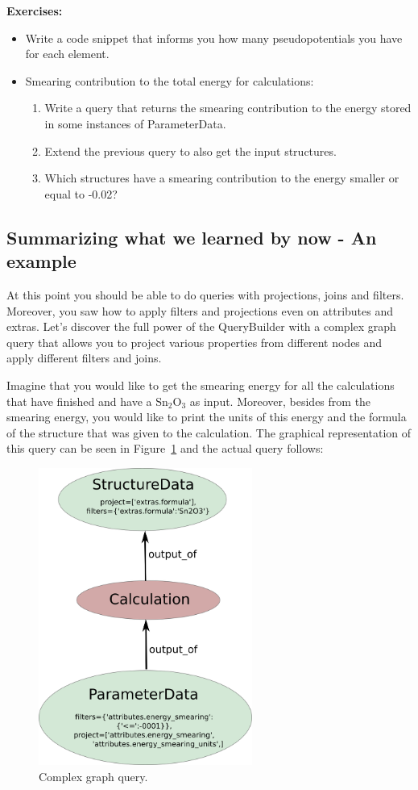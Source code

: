 \begin{tcolorbox}
\textbf{Exercises:}
\begin{itemize}
    \item Write a code snippet that informs you how many pseudopotentials you have for each element.
    \item Smearing contribution to the total energy for calculations:
    \begin{enumerate}
        \item Write a query that returns the smearing contribution to the energy stored in some instances of ParameterData.
        \item Extend the previous query to also get the input structures.
        \item Which structures have a smearing contribution to the energy smaller or equal to -0.02?
    \end{enumerate}
\end{itemize}
\end{tcolorbox}

\subsection*{Summarizing what we learned by now - An example}
At this point you should be able to do queries with projections, joins and filters. Moreover, you saw how to apply filters and projections even on attributes and extras. Let's discover the full power of the QueryBuilder with a complex graph query that allows you to project various properties from different nodes and apply different filters and joins.

Imagine that you would like to get the smearing energy for all the calculations that have finished and have a $\mathrm{Sn_{2}O_{3}}$ as input. Moreover, besides from the smearing energy, you would like to print the units of this energy and the formula of the structure that was given to the calculation.
The graphical representation of this query can be seen in Figure~\ref{fig:qb2} and the actual query follows:
\begin{figure}[!th]
\begin{center}
\includegraphics[width=7cm]{img/qb_example_2.png}
\end{center}
\caption{Complex graph query.}
\label{fig:qb2}
\end{figure}

